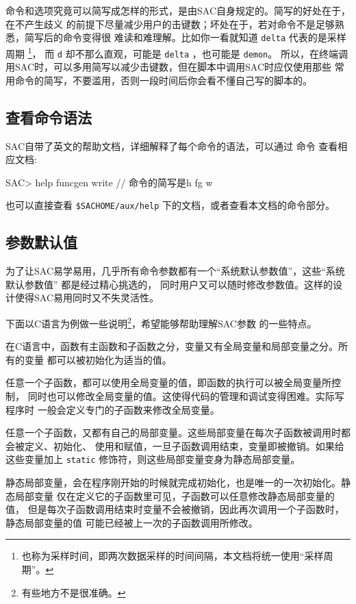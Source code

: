 命令和选项究竟可以简写成怎样的形式，是由SAC自身规定的。简写的好处在于，在不产生歧义
的前提下尽量减少用户的击键数；坏处在于，若对命令不是足够熟悉，简写后的命令变得很
难读和难理解。比如你一看就知道 \texttt{delta} 代表的是采样周期
\footnote{也称为采样时间，即两次数据采样的时间间隔，本文档将统一使用``采样周期''。}，
而 \texttt{d} 却不那么直观，可能是 \texttt{delta} ，也可能是 \texttt{demon}。
所以，在终端调用SAC时，可以多用简写以减少击键数，但在脚本中调用SAC时应仅使用那些
常用命令的简写，不要滥用，否则一段时间后你会看不懂自己写的脚本的。

\subsection{查看命令语法}
SAC自带了英文的帮助文档，详细解释了每个命令的语法，可以通过  命令
查看相应文档:
\begin{SACCode}
SAC> help funcgen write   // 命令的简写是h fg w
\end{SACCode}
也可以直接查看 \verb|$SACHOME/aux/help| 下的文档，或者查看本文档的命令部分。

\subsection{参数默认值}
为了让SAC易学易用，几乎所有命令参数都有一个``系统默认参数值''，这些``系统默认参数值''
都是经过精心挑选的，
同时用户又可以随时修改参数值。这样的设计使得SAC易用同时又不失灵活性。

下面以C语言为例做一些说明\footnote{有些地方不是很准确。}，希望能够帮助理解SAC参数
的一些特点。

在C语言中，函数有主函数和子函数之分，变量又有全局变量和局部变量之分。所有的变量
都可以被初始化为适当的值。

任意一个子函数，都可以使用全局变量的值，即函数的执行可以被全局变量所控制，
同时也可以修改全局变量的值。这使得代码的管理和调试变得困难。实际写程序时
一般会定义专门的子函数来修改全局变量。

任意一个子函数，又都有自己的局部变量。这些局部变量在每次子函数被调用时都会被定义、初始化、
使用和赋值，一旦子函数调用结束，变量即被撤销。如果给这些变量加上 \texttt{static}
修饰符，则这些局部变量变身为静态局部变量。

静态局部变量，会在程序刚开始的时候就完成初始化，也是唯一的一次初始化。静态局部变量
仅在定义它的子函数里可见，子函数可以任意修改静态局部变量的值，
但是每次子函数调用结束时变量不会被撤销，因此再次调用一个子函数时，静态局部变量的值
可能已经被上一次的子函数调用所修改。

